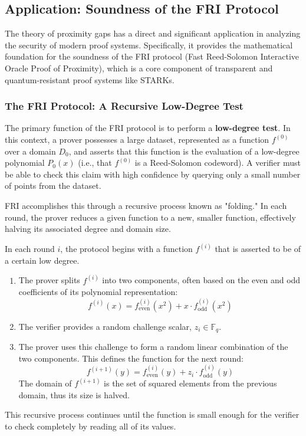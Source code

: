 \documentclass{article}
\begin{document}
\subsection{Application: Soundness of the FRI Protocol}

The theory of proximity gaps has a direct and significant application in analyzing the security of modern proof systems. Specifically, it provides the mathematical foundation for the soundness of the FRI protocol\cite{ben2018fast} (Fast Reed-Solomon Interactive Oracle Proof of Proximity), which is a core component of transparent and quantum-resistant proof systems like STARKs.

\subsubsection{The FRI Protocol: A Recursive Low-Degree Test}
The primary function of the FRI protocol is to perform a \textbf{low-degree test}. In this context, a prover possesses a large dataset, represented as a function $f^{(0)}$ over a domain $D_0$, and asserts that this function is the evaluation of a low-degree polynomial $P_0(x)$ (i.e., that $f^{(0)}$ is a Reed-Solomon codeword). A verifier must be able to check this claim with high confidence by querying only a small number of points from the dataset.

FRI accomplishes this through a recursive process known as "folding." In each round, the prover reduces a given function to a new, smaller function, effectively halving its associated degree and domain size.

\begin{tcolorbox}[breakable, title={The FRI Folding Step}]
In each round $i$, the protocol begins with a function $f^{(i)}$ that is asserted to be of a certain low degree.
\begin{enumerate}
    \item The prover splits $f^{(i)}$ into two components, often based on the even and odd coefficients of its polynomial representation:
    \[ f^{(i)}(x) = f^{(i)}_{\text{even}}(x^2) + x \cdot f^{(i)}_{\text{odd}}(x^2) \]
    \item The verifier provides a random challenge scalar, $z_i \in \mathbb{F}_q$.
    \item The prover uses this challenge to form a random linear combination of the two components. This defines the function for the next round:
    \[ f^{(i+1)}(y) = f^{(i)}_{\text{even}}(y) + z_i \cdot f^{(i)}_{\text{odd}}(y) \]
    The domain of $f^{(i+1)}$ is the set of squared elements from the previous domain, thus its size is halved.
\end{enumerate}
This recursive process continues until the function is small enough for the verifier to check completely by reading all of its values.
\end{tcolorbox}
\end{document}
